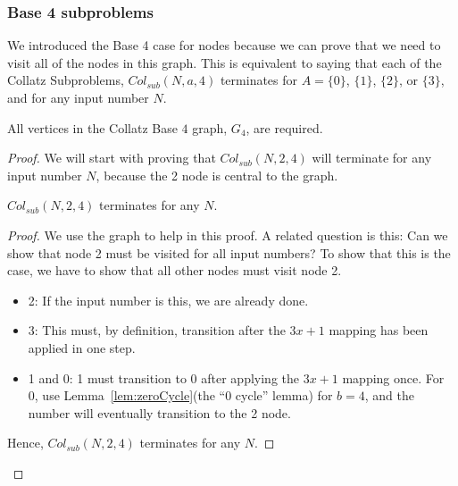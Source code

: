 \subsubsection{Base 4 subproblems} \label{subsubsec:base4subproblems}
We introduced the Base 4 case for nodes because we can prove that we need to visit all of the nodes in this graph. This is equivalent to saying that each of the Collatz Subproblems, $Col_{sub}(N,a,4)$ terminates
for $A = \{0\}$, $\{1\}$, $\{2\}$, or $\{3\}$, and for any input number $N$. 
\begin{theorem}
All vertices in the Collatz Base $4$ graph, $G_4$, are required.
\end{theorem}
\begin{proof}
We will start with proving that $Col_{sub}(N,2,4)$ will terminate for any input number $N$, because the 2 node is central to the graph.\par
\begin{lemma}
\label{lem:collatzSubTwoModFour}
$Col_{sub}(N,2,4)$ terminates for any $N$.
\end{lemma} 
\begin{proof}
We use the graph to help in this proof. A related question is this: Can we show that node 2 must be visited for all input numbers? To show that this is the case, we have to show that all other nodes must visit node 2. 
\begin{itemize}
    \item 2: If the input number is this, we are already done.
    \item 3: This must, by definition, transition after the $3x+1$ mapping has been applied in one step.
    \item 1 and 0: 1 must transition to 0 after applying the $3x+1$ mapping once. For 0, use Lemma~\ref{lem:zeroCycle}(the ``0 cycle'' lemma) for $b = 4$, and the number will eventually transition to the 2 node.
\end{itemize}
Hence, $Col_{sub}(N,2,4)$ terminates for any $N$.
\end{proof} \par


\end{proof}
